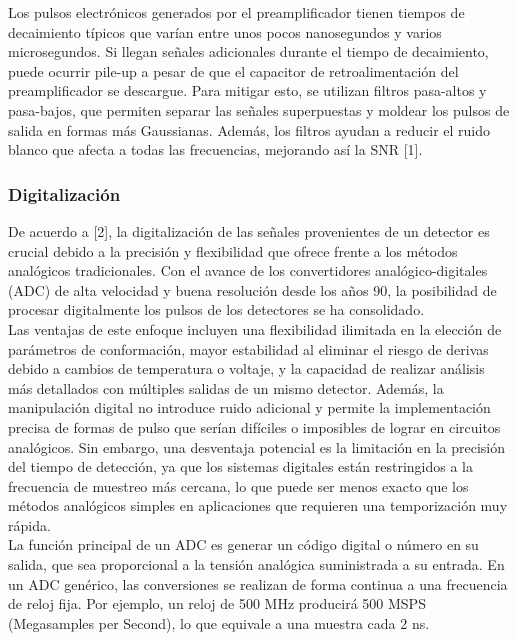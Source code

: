 \documentclass[]{book}
\begin{document}
\noindent Los pulsos electrónicos generados por el preamplificador tienen tiempos de decaimiento típicos que varían entre unos pocos nanosegundos y varios microsegundos. Si llegan señales adicionales durante el tiempo de decaimiento, puede ocurrir pile-up a pesar de que el capacitor de retroalimentación del preamplificador se descargue. Para mitigar esto, se utilizan filtros pasa-altos y pasa-bajos, que permiten separar las señales superpuestas y moldear los pulsos de salida en formas más Gaussianas. Además, los filtros ayudan a reducir el ruido blanco que afecta a todas las frecuencias, mejorando así la SNR [1].\\

\subsubsection{Digitalización}

\noindent De acuerdo a [2], la digitalización de las señales provenientes de un detector es crucial debido a la precisión y flexibilidad que ofrece frente a los métodos analógicos tradicionales. Con el avance de los convertidores analógico-digitales (ADC) de alta velocidad y buena resolución desde los años 90, la posibilidad de procesar digitalmente los pulsos de los detectores se ha consolidado.\\

\noindent Las ventajas de este enfoque incluyen una flexibilidad ilimitada en la elección de parámetros de conformación, mayor estabilidad al eliminar el riesgo de derivas debido a cambios de temperatura o voltaje, y la capacidad de realizar análisis más detallados con múltiples salidas de un mismo detector. Además, la manipulación digital no introduce ruido adicional y permite la implementación precisa de formas de pulso que serían difíciles o imposibles de lograr en circuitos analógicos. Sin embargo, una desventaja potencial es la limitación en la precisión del tiempo de detección, ya que los sistemas digitales están restringidos a la frecuencia de muestreo más cercana, lo que puede ser menos exacto que los métodos analógicos simples en aplicaciones que requieren una temporización muy rápida.\\

\noindent La función principal de un ADC es generar un código digital o número en su salida, que sea proporcional a la tensión analógica suministrada a su entrada. En un ADC genérico, las conversiones se realizan de forma continua a una frecuencia de reloj fija. Por ejemplo, un reloj de 500 MHz producirá 500 MSPS (Megasamples per Second), lo que equivale a una muestra cada 2 ns. \\
\end{document}
